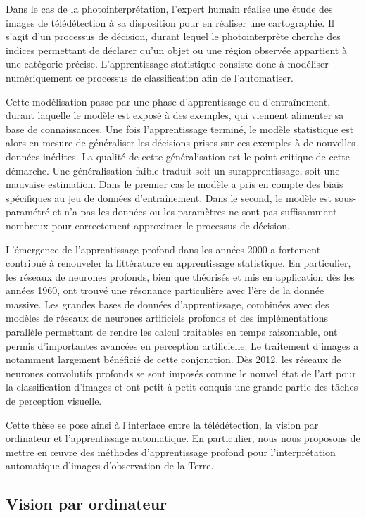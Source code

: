 Dans le cas de la photointerprétation, l'expert humain réalise une étude des images de télédétection à sa disposition pour en réaliser une cartographie. Il s'agit d'un processus de décision, durant lequel le photointerprète cherche des indices permettant de déclarer qu'un objet ou une région observée appartient à une catégorie précise. L'apprentissage statistique consiste donc à modéliser numériquement ce processus de classification afin de l'automatiser.

Cette modélisation passe par une phase d'apprentissage ou d'entraînement, durant laquelle le modèle est exposé à des exemples, qui viennent alimenter sa base de connaissances. Une fois l'apprentissage terminé, le modèle statistique est alors en mesure de généraliser les décisions prises sur ces exemples à de nouvelles données inédites. La qualité de cette généralisation est le point critique de cette démarche. Une généralisation faible traduit soit un surapprentissage, soit une mauvaise estimation. Dans le premier cas le modèle a pris en compte des biais spécifiques au jeu de données d'entraînement. Dans le second, le modèle est sous-paramétré et n'a pas les données ou les paramètres ne sont pas suffisamment nombreux pour correctement approximer le processus de décision.

L'émergence de l'apprentissage profond dans les années 2000 a fortement contribué à renouveler la littérature en apprentissage statistique. En particulier, les réseaux de neurones profonds, bien que théorisés et mis en application dès les années 1960, ont trouvé une résonance particulière avec l'ère de la donnée massive. Les grandes bases de données d'apprentissage, combinées avec des modèles de réseaux de neurones artificiels profonds et des implémentations parallèle permettant de rendre les calcul traitables en temps raisonnable, ont permis d'importantes avancées en perception artificielle. Le traitement d'images a notamment largement bénéficié de cette conjonction. Dès 2012, les réseaux de neurones convolutifs profonds se sont imposés comme le nouvel état de l'art pour la classification d'images et ont petit à petit conquis une grande partie des tâches de perception visuelle.

Cette thèse se pose ainsi à l'interface entre la télédétection, la vision par ordinateur et l'apprentissage automatique. En particulier, nous nous proposons de mettre en \oe{}uvre des méthodes d'apprentissage profond pour l'interprétation automatique d'images d'observation de la Terre.

\subsection{Vision par ordinateur}

